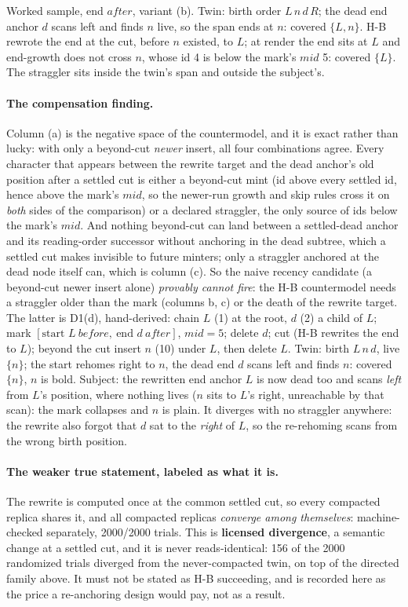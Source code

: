 \documentclass[11pt]{article}
\begin{document}
\noindent Worked sample, end $\mathit{after}$, variant (b). Twin:
birth order $L\,n\,d\,R$; the dead end anchor $d$ scans left and finds
$n$ live, so the span ends at $n$: covered $\{L, n\}$. H-B rewrote the
end at the cut, before $n$ existed, to $L$; at render the end sits at
$L$ and end-growth does not cross $n$, whose id 4 is below the mark's
$\mathit{mid}$ 5: covered $\{L\}$. The straggler sits inside the
twin's span and outside the subject's.

\paragraph{The compensation finding.} Column (a) is the negative space
of the countermodel, and it is exact rather than lucky: with only a
beyond-cut \emph{newer} insert, all four combinations agree. Every
character that appears between the rewrite target and the dead
anchor's old position after a settled cut is either a beyond-cut mint
(id above every settled id, hence above the mark's $\mathit{mid}$, so
the newer-run growth and skip rules cross it on \emph{both} sides of
the comparison) or a declared straggler, the only source of ids below
the mark's $\mathit{mid}$. And nothing beyond-cut can land between a
settled-dead anchor and its reading-order successor without anchoring
in the dead subtree, which a settled cut makes invisible to future
minters; only a straggler anchored at the dead node itself can, which
is column (c). So the naive recency candidate (a beyond-cut newer
insert alone) \emph{provably cannot fire}: the H-B countermodel needs
a straggler older than the mark (columns b, c) or the death of the
rewrite target. The latter is D1(d), hand-derived: chain $L$ (1) at
the root, $d$ (2) a child of $L$; mark $[\text{start } L\
\mathit{before},\ \text{end } d\ \mathit{after}]$, $\mathit{mid} = 5$;
delete $d$; cut (H-B rewrites the end to $L$); beyond the cut insert
$n$ (10) under $L$, then delete $L$. Twin: birth $L\,n\,d$, live
$\{n\}$; the start rehomes right to $n$, the dead end $d$ scans left
and finds $n$: covered $\{n\}$, $n$ is bold. Subject: the rewritten
end anchor $L$ is now dead too and scans \emph{left} from $L$'s
position, where nothing lives ($n$ sits to $L$'s right, unreachable by
that scan): the mark collapses and $n$ is plain. It diverges with no
straggler anywhere: the rewrite also forgot that $d$ sat to the
\emph{right} of $L$, so the re-rehoming scans from the wrong birth
position.

\paragraph{The weaker true statement, labeled as what it is.} The
rewrite is computed once at the common settled cut, so every compacted
replica shares it, and all compacted replicas \emph{converge among
themselves}: machine-checked separately, 2000/2000 trials. This is
\textbf{licensed divergence}, a semantic change at a settled cut, and
it is never reads-identical: 156 of the 2000 randomized trials
diverged from the never-compacted twin, on top of the directed family
above. It must not be stated as H-B succeeding, and is recorded here
as the price a re-anchoring design would pay, not as a result.
\end{document}
